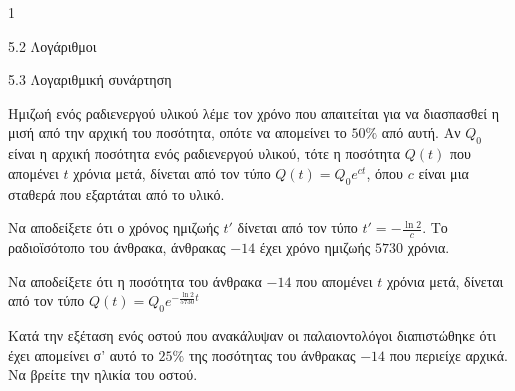 \begin{ylh}{1}
\item 5.2 Λογάριθμοι
\item 5.3 Λογαριθμική συνάρτηση
\end{ylh}
Ημιζωή ενός ραδιενεργού υλικού λέμε τον χρόνο που απαιτείται για να διασπασθεί η μισή από την αρχική του ποσότητα, οπότε να απομείνει το $50\%$ από αυτή.
Αν $Q_0$ είναι η αρχική ποσότητα ενός ραδιενεργού υλικού, τότε η ποσότητα $Q(t)$ που απομένει $t$ χρόνια μετά, δίνεται από τον τύπο $Q(t) = Q_0 e^{ct}$, όπου $c$ είναι μια σταθερά που εξαρτάται από το υλικό.
\begin{alist}
\item Να αποδείξετε ότι ο χρόνος ημιζωής $t'$ δίνεται από τον τύπο $t' = -\frac{\ln 2}{c}$.
Το ραδιοϊσότοπο του άνθρακα, άνθρακας $-14$ έχει χρόνο ημιζωής $5730$ χρόνια.
\item Να αποδείξετε ότι η ποσότητα του άνθρακα $-14$ που απομένει $t$ χρόνια μετά, δίνεται από τον τύπο
$Q(t) = Q_0 e^{-\frac{\ln 2}{5730} t}$
\item Κατά την εξέταση ενός οστού που ανακάλυψαν οι παλαιοντολόγοι διαπιστώθηκε ότι έχει απομείνει σ' αυτό το $25\%$ της ποσότητας του άνθρακας $-14$ που περιείχε αρχικά. Να βρείτε την ηλικία του οστού.
\end{alist}

